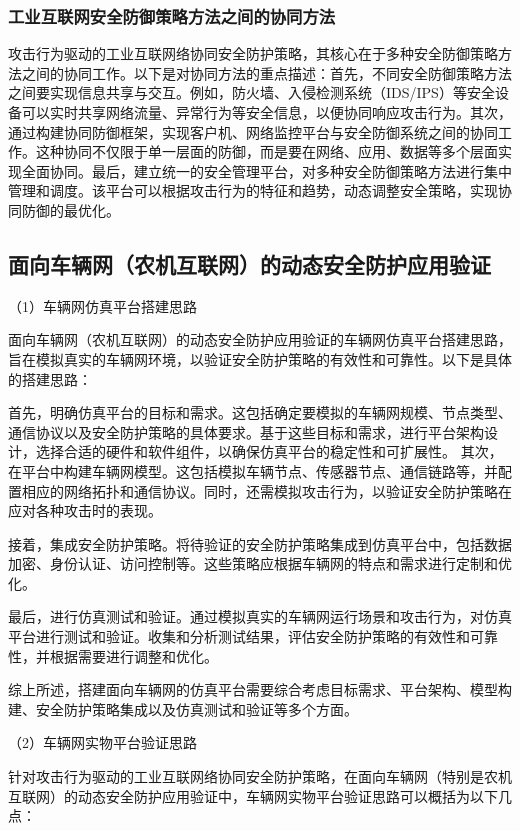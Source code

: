 \subsubsection{工业互联网安全防御策略方法之间的协同方法}

攻击行为驱动的工业互联网络协同安全防护策略，其核心在于多种安全防御策略方法之间的协同工作。以下是对协同方法的重点描述：首先，不同安全防御策略方法之间要实现信息共享与交互。例如，防火墙、入侵检测系统（IDS/IPS）等安全设备可以实时共享网络流量、异常行为等安全信息，以便协同响应攻击行为。其次，通过构建协同防御框架，实现客户机、网络监控平台与安全防御系统之间的协同工作。这种协同不仅限于单一层面的防御，而是要在网络、应用、数据等多个层面实现全面协同。最后，建立统一的安全管理平台，对多种安全防御策略方法进行集中管理和调度。该平台可以根据攻击行为的特征和趋势，动态调整安全策略，实现协同防御的最优化。


\subsection{面向车辆网（农机互联网）的动态安全防护应用验证}

（1）车辆网仿真平台搭建思路

面向车辆网（农机互联网）的动态安全防护应用验证的车辆网仿真平台搭建思路，旨在模拟真实的车辆网环境，以验证安全防护策略的有效性和可靠性。以下是具体的搭建思路：

首先，明确仿真平台的目标和需求。这包括确定要模拟的车辆网规模、节点类型、通信协议以及安全防护策略的具体要求。基于这些目标和需求，进行平台架构设计，选择合适的硬件和软件组件，以确保仿真平台的稳定性和可扩展性。
其次，在平台中构建车辆网模型。这包括模拟车辆节点、传感器节点、通信链路等，并配置相应的网络拓扑和通信协议。同时，还需模拟攻击行为，以验证安全防护策略在应对各种攻击时的表现。

接着，集成安全防护策略。将待验证的安全防护策略集成到仿真平台中，包括数据加密、身份认证、访问控制等。这些策略应根据车辆网的特点和需求进行定制和优化。

最后，进行仿真测试和验证。通过模拟真实的车辆网运行场景和攻击行为，对仿真平台进行测试和验证。收集和分析测试结果，评估安全防护策略的有效性和可靠性，并根据需要进行调整和优化。

综上所述，搭建面向车辆网的仿真平台需要综合考虑目标需求、平台架构、模型构建、安全防护策略集成以及仿真测试和验证等多个方面。

（2）车辆网实物平台验证思路

针对攻击行为驱动的工业互联网络协同安全防护策略，在面向车辆网（特别是农机互联网）的动态安全防护应用验证中，车辆网实物平台验证思路可以概括为以下几点：

